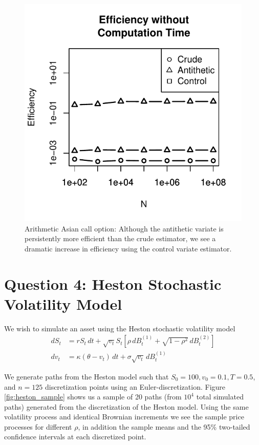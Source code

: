 \documentclass[12pt]{article}
\newlength\tindent
\renewcommand{\indent}{\hspace*{\tindent}}
\begin{document}
\begin{figure}[H]
	\centering
	\includegraphics[scale=0.75]{../plots/q3/ari_asian_call_eff_wo_time.pdf}
\caption{Arithmetic Asian call option: Although the antithetic variate is persistently more efficient than the crude estimator, we see a dramatic increase in efficiency using the control variate estimator.}
\label{fig:ari_asset_time_eff}
\end{figure}


\newpage
\section{Question 4: {\normalfont Heston Stochastic Volatility Model}}

We wish to simulate an asset using the Heston stochastic volatility model
\begin{align*}
	dS_t &= rS_t\,dt + \sqrt{v_t}S_t\left[\rho\,dB^{(1)}_t + \sqrt{1 - \rho^2}\,dB^{(2)}_t \right] \\
	dv_t &= \kappa(\theta - v_t)\,dt + \sigma\sqrt{v_t}\,dB^{(1)}_t
\end{align*}

\indent We generate paths from the Heston model such that $S_0 = 100, v_0 = 0.1, T = 0.5$, and $n = 125$ discretization points using an Euler-discretization. Figure \ref{fig:heston_sample} shows us a sample of 20 paths (from $10^4$ total simulated paths) generated from the discretization of the Heston model. Using the same volatility process and identical Brownian increments we see the sample price processes for different $\rho$, in addition the sample means and the 95\% two-tailed confidence intervals at each discretized point.
\end{document}
